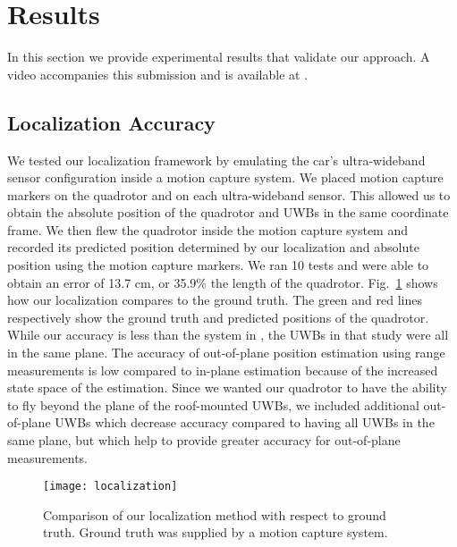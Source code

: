 
\section{Results}

In this section we provide experimental results that validate our approach.  A
video accompanies this submission and is available at \cite{foresight-video}.

\subsection{Localization Accuracy}

We tested our localization framework by emulating the car's ultra-wideband
sensor configuration inside a motion capture system. We placed motion capture
markers on the quadrotor and on each ultra-wideband sensor. This allowed us to
obtain the absolute position of the quadrotor and UWBs in the same coordinate
frame. We then flew the quadrotor inside the motion capture system and recorded
its predicted position determined by our localization and absolute position
using the motion capture markers. We ran 10 tests and were able to obtain an error of
13.7 cm, or 35.9\% the length of the quadrotor. Fig.~\ref{fig:localization}
shows how our localization compares to the ground truth. The green and red
lines respectively show the ground truth and predicted positions of the
quadrotor. While our accuracy is less than the system in \cite{tobiuwb}, the UWBs
in that study were all in the same plane. The accuracy of out-of-plane position estimation
using range measurements is low compared to in-plane estimation because of the
increased state space of the estimation. Since we wanted
our quadrotor to have the ability to fly beyond the plane of the roof-mounted UWBs,
we included additional out-of-plane UWBs which decrease accuracy compared to
having all UWBs in the same plane, but which help to provide greater accuracy for
out-of-plane measurements.



\begin{figure}

    \centering

    \texttt{[image: localization]}

    \caption{Comparison of our localization method with respect to
    ground truth. Ground truth was supplied by a motion capture system.}

    \label{fig:localization}

\end{figure}


